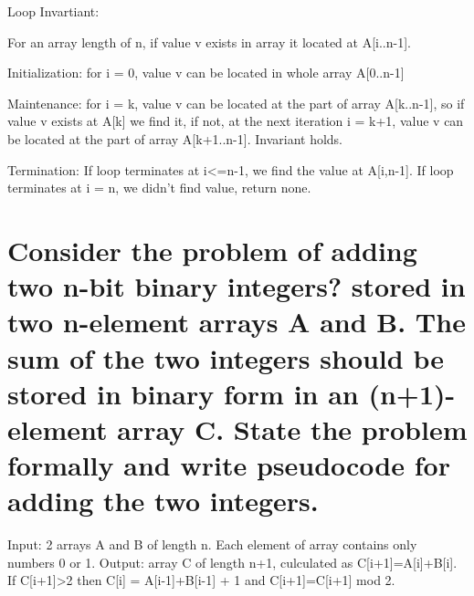 \documentclass{article}
\begin{document}
Loop Invartiant:

For an array length of n, if value v exists in array it located at A[i..n-1].

Initialization: for i = 0, value v can be located in whole array A[0..n-1]

Maintenance: for i = k, value v can be located at the part of array A[k..n-1],
 so if value v exists at A[k] we find it, if not, at the next iteration  i = k+1, value v can be located at the part of array A[k+1..n-1].
Invariant holds.		

Termination: If loop terminates at i<=n-1, we find the value at A[i,n-1]. If loop terminates at i = n, we didn't find value, return none.

\section{Consider the problem of adding two n-bit binary integers? stored in two n-element arrays A and B. The sum of the two integers should be stored in binary form in an (n+1)-element array C. State the problem formally and write pseudocode for adding the two integers.}

Input: 2 arrays A and B of length n. Each element of array contains only numbers 0 or 1.
Output: array C of length n+1, culculated as C[i+1]=A[i]+B[i]. If C[i+1]>2 then C[i] = A[i-1]+B[i-1] + 1 and C[i+1]=C[i+1] mod 2.


\end{document}
